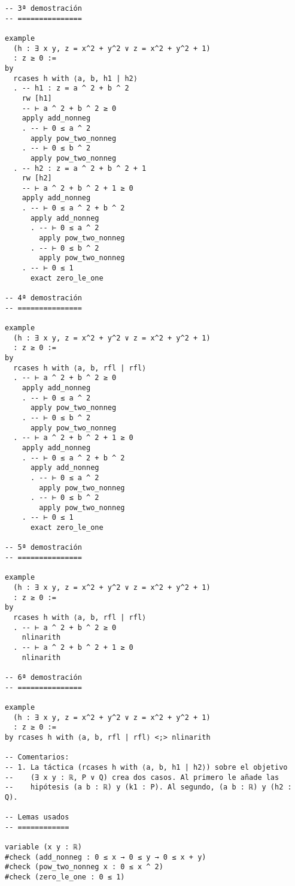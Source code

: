 \begin{verbatim}
-- 3ª demostración
-- ===============

example
  (h : ∃ x y, z = x^2 + y^2 ∨ z = x^2 + y^2 + 1)
  : z ≥ 0 :=
by
  rcases h with ⟨a, b, h1 | h2⟩
  . -- h1 : z = a ^ 2 + b ^ 2
    rw [h1]
    -- ⊢ a ^ 2 + b ^ 2 ≥ 0
    apply add_nonneg
    . -- ⊢ 0 ≤ a ^ 2
      apply pow_two_nonneg
    . -- ⊢ 0 ≤ b ^ 2
      apply pow_two_nonneg
  . -- h2 : z = a ^ 2 + b ^ 2 + 1
    rw [h2]
    -- ⊢ a ^ 2 + b ^ 2 + 1 ≥ 0
    apply add_nonneg
    . -- ⊢ 0 ≤ a ^ 2 + b ^ 2
      apply add_nonneg
      . -- ⊢ 0 ≤ a ^ 2
        apply pow_two_nonneg
      . -- ⊢ 0 ≤ b ^ 2
        apply pow_two_nonneg
    . -- ⊢ 0 ≤ 1
      exact zero_le_one

-- 4ª demostración
-- ===============

example
  (h : ∃ x y, z = x^2 + y^2 ∨ z = x^2 + y^2 + 1)
  : z ≥ 0 :=
by
  rcases h with ⟨a, b, rfl | rfl⟩
  . -- ⊢ a ^ 2 + b ^ 2 ≥ 0
    apply add_nonneg
    . -- ⊢ 0 ≤ a ^ 2
      apply pow_two_nonneg
    . -- ⊢ 0 ≤ b ^ 2
      apply pow_two_nonneg
  . -- ⊢ a ^ 2 + b ^ 2 + 1 ≥ 0
    apply add_nonneg
    . -- ⊢ 0 ≤ a ^ 2 + b ^ 2
      apply add_nonneg
      . -- ⊢ 0 ≤ a ^ 2
        apply pow_two_nonneg
      . -- ⊢ 0 ≤ b ^ 2
        apply pow_two_nonneg
    . -- ⊢ 0 ≤ 1
      exact zero_le_one

-- 5ª demostración
-- ===============

example
  (h : ∃ x y, z = x^2 + y^2 ∨ z = x^2 + y^2 + 1)
  : z ≥ 0 :=
by
  rcases h with ⟨a, b, rfl | rfl⟩
  . -- ⊢ a ^ 2 + b ^ 2 ≥ 0
    nlinarith
  . -- ⊢ a ^ 2 + b ^ 2 + 1 ≥ 0
    nlinarith

-- 6ª demostración
-- ===============

example
  (h : ∃ x y, z = x^2 + y^2 ∨ z = x^2 + y^2 + 1)
  : z ≥ 0 :=
by rcases h with ⟨a, b, rfl | rfl⟩ <;> nlinarith

-- Comentarios:
-- 1. La táctica (rcases h with ⟨a, b, h1 | h2⟩) sobre el objetivo
--    (∃ x y : ℝ, P ‌∨ Q) crea dos casos. Al primero le añade las
--    hipótesis (a b : ℝ) y (k1 : P). Al segundo, (a b : ℝ) y (h2 : Q).

-- Lemas usados
-- ============

variable (x y : ℝ)
#check (add_nonneg : 0 ≤ x → 0 ≤ y → 0 ≤ x + y)
#check (pow_two_nonneg x : 0 ≤ x ^ 2)
#check (zero_le_one : 0 ≤ 1)
\end{verbatim}


